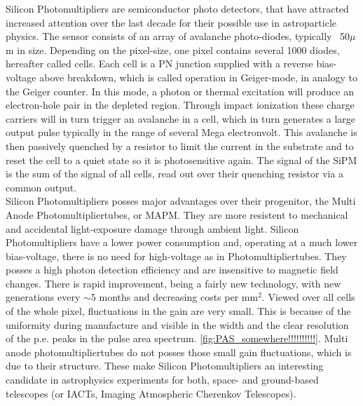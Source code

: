 \documentclass[12pt,article,type=msc,colorback,accentcolor=tud9c]{tudthesis}
\begin{document}
\begin{figure}[h]
\begin{centering}
}
\caption{}
\label{fig:SiPM_scheme}
\end{centering}
\end{figure}

Silicon Photomultipliers are semiconductor photo detectors, that have attracted increased attention over the last decade for their possible use in astroparticle physics. The sensor consists of an array of avalanche photo-diodes, typically ~50$\mu$m in size. Depending on the pixel-size, one pixel contains several 1000 diodes, hereafter called cells. Each cell is a PN junction supplied with a reverse bias-voltage above breakdown, which is called operation in Geiger-mode, in analogy to the Geiger counter. In this mode, a photon or thermal excitation will produce an electron-hole pair in the depleted region. Through impact ionization these charge carriers will in turn trigger an avalanche in a cell, which in turn generates a large output pulse typically in the range of several Mega electronvolt. This avalanche is then passively quenched by a resistor to limit the current in the substrate and to reset the cell to a quiet state so it is photosensitive again. The signal of the SiPM is the sum of the signal of all cells, read out over their quenching resistor via a common output.\\
Silicon Photomultipliers posses major advantages over their progenitor, the Multi Anode Photomultipliertubes, or MAPM. They are more resistent to mechanical and accidental light-exposure damage through ambient light. Silicon Photomultipliers have a lower power consumption and, operating at a much lower bias-voltage, there is no need for high-voltage as in Photomultipliertubes. They posses a high photon detection efficiency and are insensitive to magnetic field changes. There is rapid improvement, being a fairly new technology, with new generations every $\sim$5 months and decreasing costs per mm$^2$. Viewed over all cells of the whole pixel, fluctuations in the gain are very small. This is because of the uniformity during manufacture and visible in the width and the clear resolution of the p.e. peaks in the pulse area spectrum. \ref{fig:PAS_somewhere!!!!!!!!!!}. Multi anode photomultipliertubes do not posses those small gain fluctuations, which is due to their structure. These make Silicon Photomultipliers an interesting candidate in astrophysics experiments for both, space- and ground-based telescopes (or IACTs, Imaging Atmospheric Cherenkov Telescopes). 
\end{document}
